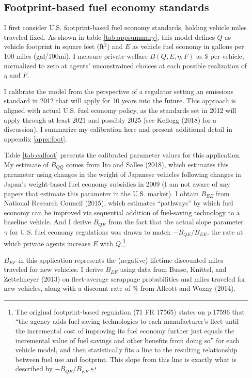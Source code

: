 \documentclass[12pt]{article}
\begin{document}
\subsection{Footprint-based fuel economy standards} \label{sec:footprint}
I first consider U.S. footprint-based fuel economy standards, holding vehicle miles traveled fixed. As shown in table \ref{tab:appsummary}, this model defines $Q$ as vehicle footprint in square feet (ft$^2$) and $E$ as vehicle fuel economy in gallons per 100 miles (gal/100mi). I measure private welfare $B(Q,E,\eta,F)$ as \$ per vehicle, normalized to zero at agents' unconstrained choices at each possible realization of $\eta$ and $F$. 

I calibrate the model from the perspective of a regulator setting an emissions standard in 2012 that will apply for 10 years into the future. This approach is aligned with actual U.S. fuel economy policy, as the standards set in 2012 will apply through at least 2021 and possibly 2025 (see Kellogg (2018) for a discussion). I summarize my calibration here and present additional detail in appendix \ref{appx:foot}.

Table \ref{tab:calfoot} presents the calibrated parameter values for this application. My estimate of $B_{QQ}$ comes from Ito and Sallee (2018), which estimates this parameter using changes in the weight of Japanese vehicles following changes in Japan's weight-based fuel economy subsidies in 2009 (I am not aware of any papers that estimate this parameter in the U.S. market). I obtain $B_{EE}$ from National Research Council (2015), which estimates ``pathways'' by which fuel economy can be improved via sequential addition of fuel-saving technology to a baseline vehicle. And I derive $B_{QE}$ from the fact that the actual slope parameter $\gamma$ for U.S. fuel economy regulations was drawn to match $-B_{QE}/B_{EE}$, the rate at which private agents increase $E$ with $Q$.\footnote{The original footprint-based regulation (71 FR 17565) states on p.17596 that ``the agency adds fuel saving technologies to each manufacturer's fleet until the incremental cost of improving its fuel economy further just equals the incremental value of fuel savings and other benefits from doing so'' for each vehicle model, and then statistically fits a line to the resulting relationship between fuel use and footprint. This slope from this line is exactly what is described by $-B_{QE}/B_{EE}$.}

$B_{EF}$ in this application represents the (negative) lifetime discounted miles traveled for new vehicles. I derive $B_{EF}$ using data from Busse, Knittel, and Zettelmeyer (2013) on fleet-average scrappage probabilities and miles traveled for new vehicles, along with a discount rate of \unskip\% from Allcott and Wozny (2014).
\end{document}
